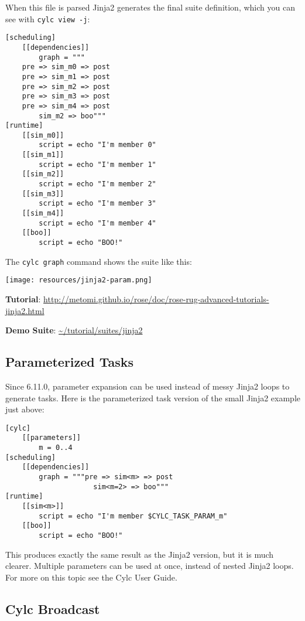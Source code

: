 When this file is parsed Jinja2 generates the final suite definition, which
you can see with \lstinline=cylc view -j=:
\begin{lstlisting}
[scheduling]
    [[dependencies]]
        graph = """
    pre => sim_m0 => post
    pre => sim_m1 => post
    pre => sim_m2 => post
    pre => sim_m3 => post
    pre => sim_m4 => post
        sim_m2 => boo"""
[runtime]
    [[sim_m0]]
        script = echo "I'm member 0"
    [[sim_m1]]
        script = echo "I'm member 1"
    [[sim_m2]]
        script = echo "I'm member 2"
    [[sim_m3]]
        script = echo "I'm member 3"
    [[sim_m4]]
        script = echo "I'm member 4"
    [[boo]]
        script = echo "BOO!"
\end{lstlisting}

The \lstinline=cylc graph= command shows the suite like this:
\begin{center}
\texttt{[image: resources/jinja2-param.png]}
\end{center}

\begin{shaded*}
\textbf{Tutorial}: \url{http://metomi.github.io/rose/doc/rose-rug-advanced-tutorials-jinja2.html}

\textbf{Demo Suite}:
\url{~/tutorial/suites/jinja2}
\end{shaded*}

\subsection{Parameterized Tasks}

Since 6.11.0, parameter expansion can be used instead of messy Jinja2 loops
to generate tasks. Here is the parameterized task version of the
small Jinja2 example just above:

\begin{lstlisting}
[cylc]
    [[parameters]]
        m = 0..4
[scheduling]
    [[dependencies]]
        graph = """pre => sim<m> => post
                     sim<m=2> => boo"""
[runtime]
    [[sim<m>]]
        script = echo "I'm member $CYLC_TASK_PARAM_m"
    [[boo]]
        script = echo "BOO!"
\end{lstlisting}

This produces exactly the same result as the Jinja2 version, but it is much
clearer. Multiple parameters can be used at once, instead of nested Jinja2
loops.  For more on this topic see the Cylc User Guide.


\subsection{Cylc Broadcast}

